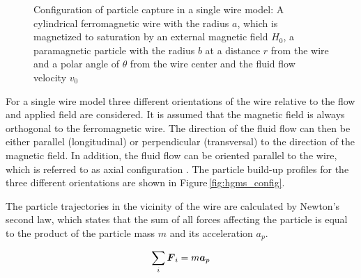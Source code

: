 \begin{figure}[h]
\centering
{}
\caption[Configuration of particle capture in a single wire model]{Configuration of particle capture in a single wire model: A cylindrical ferromagnetic wire with the radius $a$, which is magnetized to saturation by an external magnetic field $H_{0}$, a paramagnetic particle with the radius $b$ at a distance $r$ from the wire and a polar angle of $\theta$ from the wire center and the fluid flow velocity $v_{0}$ \cite{svoboda2004magnetic}
\label{fig:wire}
}
\end{figure}

For a single wire model three different orientations of the wire relative to the flow and applied field are considered. It is assumed that the magnetic field is always orthogonal to the ferromagnetic wire. The direction of the fluid flow can then be either parallel (longitudinal) or perpendicular (transversal) to the direction of the magnetic field. In addition, the fluid flow can be oriented parallel to the wire, which is referred to as axial configuration \cite{friedlaender1978particle}. The particle build-up profiles for the three different orientations are shown in Figure\,\ref{fig:hgms_config}.   

The particle trajectories in the vicinity of the wire are calculated by Newton's second law, which states that the sum of all forces affecting the particle is equal to the product of the particle mass $m$ and its acceleration $a_{p}$. 

\begin{equation}
\label{eq:mag_force_sum}
\centering
\sum_{i}\boldsymbol{F}_{i} = m\boldsymbol{a}_{p}
\end{equation}
 
